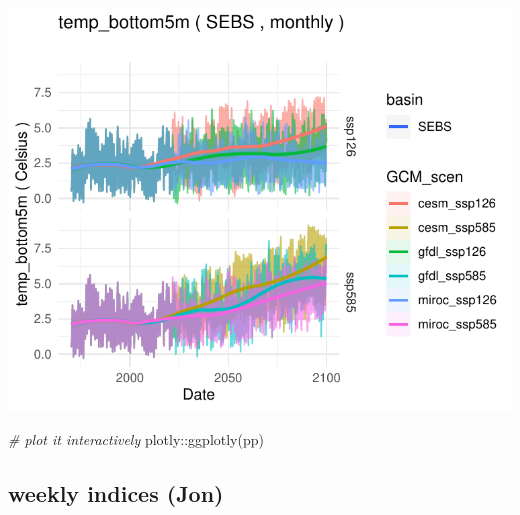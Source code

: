 \documentclass[
]{article}
\newenvironment{Shaded}{\begin{snugshade}}{\end{snugshade}}
\newcommand{\CommentTok}[1]{\textcolor[rgb]{0.56,0.35,0.01}{\textit{#1}}}
\newcommand{\FunctionTok}[1]{\textcolor[rgb]{0.00,0.00,0.00}{#1}}
\newcommand{\NormalTok}[1]{#1}
\newcommand{\SpecialCharTok}[1]{\textcolor[rgb]{0.00,0.00,0.00}{#1}}
\begin{document}
\begin{center}\includegraphics{ACLIM2_quickStart_files/figure-latex/ewe-2} \end{center}

\begin{Shaded}
\begin{Highlighting}[]
\CommentTok{\# plot it interactively}
\NormalTok{plotly}\SpecialCharTok{::}\FunctionTok{ggplotly}\NormalTok{(pp)}
\end{Highlighting}
\end{Shaded}

\hypertarget{weekly-indices-jon}{%
\subsection{weekly indices (Jon)}\label{weekly-indices-jon}}
\end{document}
